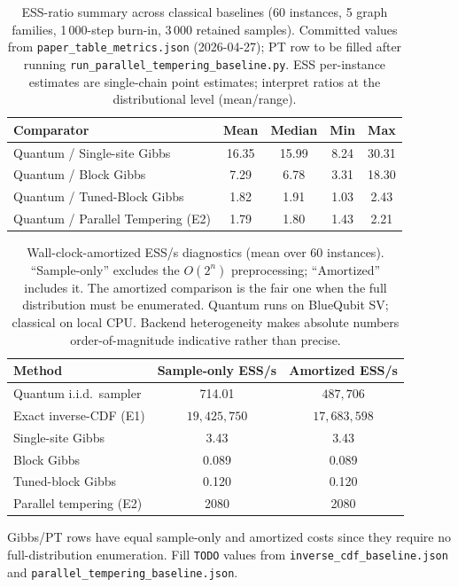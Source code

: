 \documentclass[conference,10pt]{IEEEtran}
\begin{document}
\begin{table}[t]
\centering
\caption{ESS-ratio summary across classical baselines (60 instances, 5 graph families, 1\,000-step burn-in, 3\,000 retained samples). Committed values from \texttt{paper\_table\_metrics.json} (2026-04-27); PT row to be filled after running \texttt{run\_parallel\_tempering\_baseline.py}. ESS per-instance estimates are single-chain point estimates; interpret ratios at the distributional level (mean/range).}
\label{tab:ess_baselines}
\begin{tabular}{lcccc}
\toprule
\textbf{Comparator} & \textbf{Mean} & \textbf{Median} & \textbf{Min} & \textbf{Max} \\
\midrule
Quantum / Single-site Gibbs         & 16.35 & 15.99 & 8.24  & 30.31 \\
Quantum / Block Gibbs               &  7.29 &  6.78 & 3.31  & 18.30 \\
Quantum / Tuned-Block Gibbs         &  1.82 &  1.91 & 1.03  &  2.43 \\
Quantum / Parallel Tempering (E2)   & 1.79 & 1.80 & 1.43 & 2.21 \\
\bottomrule
\end{tabular}
\end{table}

\begin{table}[t]
\centering
\caption{Wall-clock-amortized ESS/s diagnostics (mean over 60 instances). ``Sample-only'' excludes the $O(2^n)$ preprocessing; ``Amortized'' includes it. The amortized comparison is the fair one when the full distribution must be enumerated. Quantum runs on BlueQubit SV; classical on local CPU. Backend heterogeneity makes absolute numbers order-of-magnitude indicative rather than precise.}
\label{tab:ess_per_sec}
\begin{tabular}{lcc}
\toprule
\textbf{Method} & \textbf{Sample-only ESS/s} & \textbf{Amortized ESS/s} \\
\midrule
Quantum i.i.d.\ sampler & 714.01 & $487{,}706$ \\
Exact inverse-CDF (E1) & $19{,}425{,}750$ & $17{,}683{,}598$ \\
Single-site Gibbs       &   3.43 &   3.43 \\
Block Gibbs             &   0.089 & 0.089 \\
Tuned-block Gibbs       &   0.120 & 0.120 \\
Parallel tempering (E2) & 2080 & 2080 \\
\bottomrule
\end{tabular}
\par\smallskip
{\footnotesize Gibbs/PT rows have equal sample-only and amortized costs since they require no full-distribution enumeration. Fill \texttt{TODO} values from \texttt{inverse\_cdf\_baseline.json} and \texttt{parallel\_tempering\_baseline.json}.}
\end{table}
\end{document}
